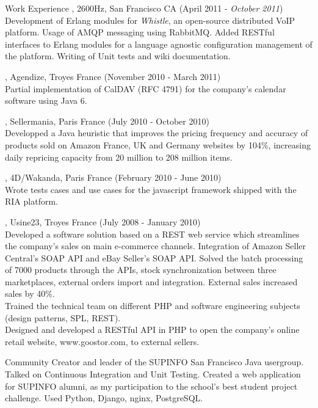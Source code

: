 \documentclass{resume}
\begin{document}
\begin{category}{Work Experience}
, 2600Hz, San Francisco CA (April 2011 - \emph{October 2011})
\\Development of Erlang modules for \emph{Whistle}, an open-source distributed VoIP platform. Usage of AMQP messaging using RabbitMQ. Added RESTful interfaces to Erlang modules for a language agnostic configuration management of the platform. Writing of Unit tests and wiki documentation.

, Agendize, Troyes France (November 2010 - March 2011)
\\Partial implementation of CalDAV (RFC 4791) for the company's calendar software using Java 6.

, Sellermania, Paris France (July 2010 - October 2010)
\\Developped a Java heuristic that improves the pricing frequency and accuracy of products sold on Amazon France, UK and Germany websites by 104\%, increasing daily repricing capacity from 20 million to 208 million items.

, 4D/Wakanda, Paris France (February 2010 - June 2010)
\\Wrote tests cases and use cases for the javascript framework shipped with the RIA platform.

, Usine23, Troyes France (July 2008 - January 2010)
\\Developed a software solution based on a REST web service which streamlines the company’s sales on main e-commerce channels. Integration of Amazon Seller Central's SOAP API and eBay Seller's SOAP API. Solved the batch processing of 7000 products through the APIs, stock synchronization between three marketplaces, external orders import and integration. External sales increased sales by 40\%.
\\Trained the technical team on different PHP and software engineering subjects (design patterns, SPL, REST).
\\Designed and developed a RESTful API in PHP to open the company’s online retail website, www.goostor.com, to external sellers.
\end{category}

\begin{category}{Community} 
\citemnobullet Creator and leader of the SUPINFO San Francisco Java usergroup. 
Talked on Continuous Integration and Unit Testing.
\citemnobullet Created a web application for SUPINFO alumni, as my participation to the school's best student project challenge. 
Used Python, Django, nginx, PostgreSQL.
\end{category}
\end{document}
